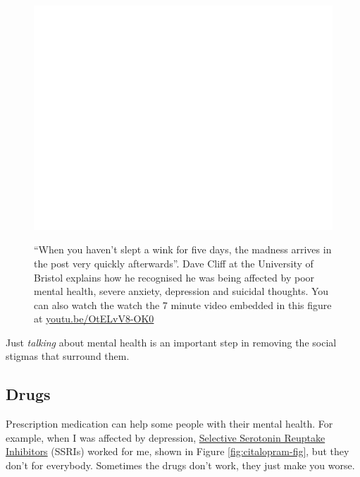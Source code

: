 \documentclass[
]{book}
\begin{document}
\begin{figure}

{\centering \href{https://www.youtube.com/embed/OtELvV8-OK0}{\includegraphics[width=0.99\linewidth]{cdyf_files/figure-latex/cliff-fig-1} }

}

\caption{``When you haven't slept a wink for five days, the madness arrives in the post very quickly afterwards''. Dave Cliff at the University of Bristol explains how he recognised he was being affected by poor mental health, severe anxiety, depression and suicidal thoughts. \citep{thecliff} You can also watch the watch the 7 minute video embedded in this figure at \href{https://youtu.be/OtELvV8-OK0}{youtu.be/OtELvV8-OK0} \citep{youtube-davecliff}}\label{fig:cliff-fig}
\end{figure}



Just \emph{talking} about mental health is an important step in removing the social stigmas that surround them.

\hypertarget{drugs}{%
\subsection{Drugs}\label{drugs}}

Prescription medication can help some people with their mental health. For example, when I was affected by depression, \href{https://www.nhs.uk/conditions/ssri-antidepressants/}{Selective Serotonin Reuptake Inhibitors} (SSRIs) worked for me, shown in Figure \ref{fig:citalopram-fig}, but they don't for everybody. Sometimes the drugs don't work, they just make you worse. \citep{drugsdontwork}
\end{document}
